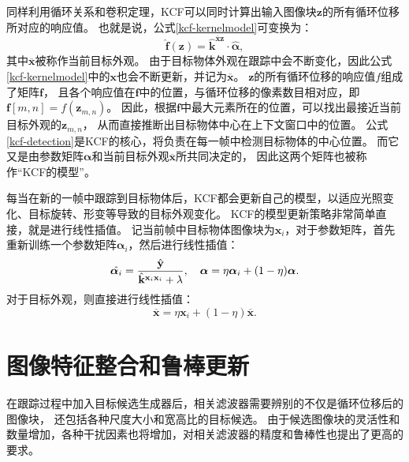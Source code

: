 同样利用循环关系和卷积定理，KCF可以同时计算出输入图像块$\mathbf{z}$的所有循环位移所对应的响应值。
也就是说，公式\ref{kcf-kernelmodel}可变换为：
\begin{equation}
	\hat{\mathbf{f}}(\mathbf{z})=\hat{\mathbf{k}}^{\overline{\mathbf{x}}\mathbf{z}}\cdot\hat{\boldsymbol{\alpha}},\label{kcf-detection}
\end{equation}
其中$\overline{\mathbf{x}}$被称作当前目标外观。
由于目标物体外观在跟踪中会不断变化，因此公式\ref{kcf-kernelmodel}中的$\mathbf{x}$也会不断更新，并记为$\overline{\mathbf{x}}$。
$\mathbf{z}$的所有循环位移的响应值$f$组成了矩阵$\mathbf{f}$，
且各个响应值在$\mathbf{f}$中的位置，与循环位移的像素数目相对应，即$\mathbf{f}[m,n]=f(\mathbf{z}_{m,n})$。
因此，根据$\mathbf{f}$中最大元素所在的位置，可以找出最接近当前目标外观的$\mathbf{z}_{m,n}$，
从而直接推断出目标物体中心在上下文窗口中的位置。
公式\ref{kcf-detection}是KCF的核心，将负责在每一帧中检测目标物体的中心位置。
而它又是由参数矩阵$\boldsymbol{\alpha}$和当前目标外观$\overline{\mathbf{x}}$所共同决定的，
因此这两个矩阵也被称作``KCF的模型''。

每当在新的一帧中跟踪到目标物体后，KCF都会更新自己的模型，以适应光照变化、目标旋转、形变等导致的目标外观变化。
KCF的模型更新策略非常简单直接，就是进行线性插值。
记当前帧中目标物体图像块为$\mathbf{x}_i$，对于参数矩阵，首先重新训练一个参数矩阵$\boldsymbol{\alpha}_i$，然后进行线性插值：
\begin{equation}
	\hat{\boldsymbol{\alpha}_i}=\frac{\hat{\mathbf{y}}}{\hat{\mathbf{k}}{}^{\mathbf{x}_i\mathbf{x}_i}+\lambda}, \\ \ \ \ 
	\boldsymbol{\alpha}=\eta{\boldsymbol{\alpha}_i} + ( 1-\eta )\boldsymbol{\alpha}.
	\label{kcf_learning2}
\end{equation}
对于目标外观，则直接进行线性插值：
\begin{equation}
\overline{\mathbf{x}}=\eta\mathbf{x}_i+(1-\eta)\overline{\mathbf{x}}.
\label{kcf_appearlearning}
\end{equation}


\section{图像特征整合和鲁棒更新}
在跟踪过程中加入目标候选生成器后，相关滤波器需要辨别的不仅是循环位移后的图像块，
还包括各种尺度大小和宽高比的目标候选。
由于候选图像块的灵活性和数量增加，各种干扰因素也将增加，对相关滤波器的精度和鲁棒性也提出了更高的要求。

